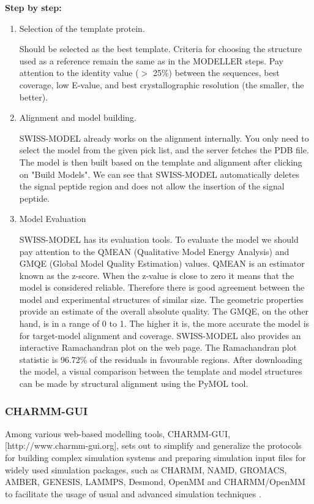 \documentclass[11pt, letterpaper, english]{article}
\begin{document}
        \par \textbf{Step by step:}
            \begin{enumerate}
                \item Selection of the template protein.
                \par  Should be selected as the best template. Criteria for choosing the structure used as a reference remain the same as in the MODELLER steps. Pay attention to the identity value ($>$ 25\%) between the sequences, best coverage, low E-value, and best crystallographic resolution (the smaller, the better).
               \item Alignment and model building.
               \par SWISS-MODEL already works on the alignment internally. You only need to select the model from the given pick list, and the server fetches the PDB file. The model is then built based on the template and alignment after clicking on "Build Models". We can see that SWISS-MODEL automatically deletes the signal peptide region and does not allow the insertion of the signal peptide.
                \item Model Evaluation
                \par SWISS-MODEL has its evaluation tools. To evaluate the model we should pay attention to the QMEAN (Qualitative Model Energy Analysis) and GMQE (Global Model Quality Estimation) values. QMEAN is an estimator known as the z-score. When the z-value is close to zero it means that the model is considered reliable. Therefore there is good agreement between the model and experimental structures of similar size. The geometric properties provide an estimate of the overall absolute quality. The GMQE, on the other hand, is in a range of 0 to 1. The higher it is, the more accurate the model is for target-model alignment and coverage. SWISS-MODEL also provides an interactive Ramachandran plot on the web page. The Ramachandran plot statistic is 96.72\% of the residuals in favourable regions. After downloading the model, a visual comparison between the template and model structures can be made by structural alignment using the PyMOL tool.
            \end{enumerate}

\subsubsection{CHARMM-GUI}
        \par Among various web-based modelling tools, CHARMM-GUI, [http://www.charmm-gui.org], sets out to simplify and generalize the protocols for building complex simulation systems and preparing simulation input files for widely used simulation packages, such as CHARMM, NAMD, GROMACS, AMBER, GENESIS, LAMMPS, Desmond, OpenMM and CHARMM/OpenMM to facilitate the usage of usual and advanced simulation techniques \cite{Jo_2017}.
     
\end{document}
